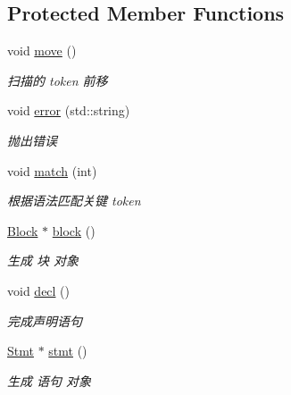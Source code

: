 \subsection*{Protected Member Functions}
\begin{DoxyCompactItemize}
\item 
\mbox{\label{class_parser_ae6cc5bf3ee250c954a36bd16f7559d79}} 
void \hyperlink{class_parser_ae6cc5bf3ee250c954a36bd16f7559d79}{move} ()
\begin{DoxyCompactList}\small\item\em 扫描的 token 前移 \end{DoxyCompactList}\item 
\mbox{\label{class_parser_a0915f6c61a1a70038a8608ff7a823b5a}} 
void \hyperlink{class_parser_a0915f6c61a1a70038a8608ff7a823b5a}{error} (std\+::string)
\begin{DoxyCompactList}\small\item\em 抛出错误 \end{DoxyCompactList}\item 
\mbox{\label{class_parser_a009517efe4fe90b136071179beb32360}} 
void \hyperlink{class_parser_a009517efe4fe90b136071179beb32360}{match} (int)
\begin{DoxyCompactList}\small\item\em 根据语法匹配关键 token \end{DoxyCompactList}\item 
\hyperlink{class_block}{Block} $\ast$ \hyperlink{class_parser_a2e96322fd6d40261ab256a726634c1b3}{block} ()
\begin{DoxyCompactList}\small\item\em 生成 块 对象 \end{DoxyCompactList}\item 
void \hyperlink{class_parser_a44a52c6402e86b0a200e02b516f8e9fe}{decl} ()
\begin{DoxyCompactList}\small\item\em 完成声明语句 \end{DoxyCompactList}\item 
\mbox{\label{class_parser_ab1ae72a37dbe2118ab65ad8f4dec4630}} 
\hyperlink{class_stmt}{Stmt} $\ast$ \hyperlink{class_parser_ab1ae72a37dbe2118ab65ad8f4dec4630}{stmt} ()
\begin{DoxyCompactList}\small\item\em 生成 语句 对象 \end{DoxyCompactList}\item 

\end{DoxyCompactItemize}
